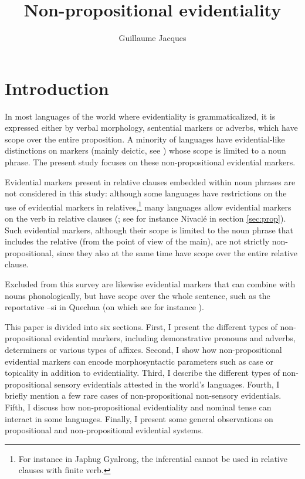 \documentclass[oneside,a4paper,11pt]{article}
\newcommand{\ipa}[1]{{\phon \mbox{#1}}} %
\begin{document}
 
\sloppy

\title{Non-propositional evidentiality}
\author{Guillaume Jacques}
\maketitle

\section{Introduction}
In most languages of the world where evidentiality is grammaticalized, it is expressed either by verbal morphology, sentential markers or adverbs, which have scope over the entire proposition. A minority of languages have evidential-like distinctions on markers (mainly deictic, see \citealt[130]{aikhenvald06}) whose scope is limited to a noun phrase. The present study focuses on these non-propositional evidential markers.

Evidential markers present in relative clauses embedded within noun phrases are not considered in this study: although some languages have restrictions on the use of evidential markers in relatives,\footnote{For instance in Japhug Gyalrong, the inferential cannot be used in relative clauses with finite verb.} many languages allow evidential markers on the verb in relative clauses (\citealt[253-6]{aikhenvald06}; see for instance Nivaclé in section \ref{sec:prop}). Such evidential markers, although their scope is limited to the noun phrase that includes the relative (from the point of view of the main), are not strictly non-propositional, since they also at the same time have scope over the entire relative clause.


Excluded from this survey are likewise evidential markers that can combine with nouns phonologically, but have scope over the whole sentence, such as the reportative  \ipa{--si} in Quechua (on which see for instance \citealt{faller02cuzco}).

 
This paper is divided into six sections.  First, I present the different types of   non-propositional evidential markers, including demonstrative pronouns and adverbs, determiners or various types of affixes. Second,  I show how non-propositional evidential markers can encode  morphosyntactic parameters such as case or topicality in addition to evidentiality. Third, I describe the different types of non-propositional sensory evidentials attested in the world's languages. Fourth, I briefly mention a few rare cases of non-propositional non-sensory evidentials. Fifth, I discuss how non-propositional evidentiality and nominal tense can interact in some languages. Finally, I present some general observations on propositional and non-propositional evidential systems.
\end{document}
